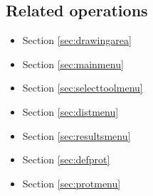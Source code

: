   \subsection*{Related operations}
  \begin{itemize}
  \item Section \ref{sec:drawingarea}
  \item Section \ref{sec:mainmenu}
  \item Section \ref{sec:selecttoolmenu}
  \item Section \ref{sec:distmenu}
  \item Section \ref{sec:resultsmenu}
  \item Section \ref{sec:defprot}
  \item Section \ref{sec:protmenu}
  \end{itemize}